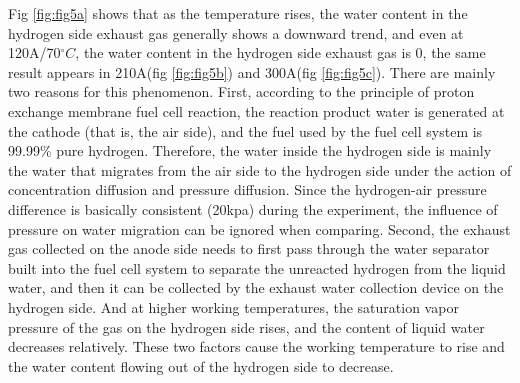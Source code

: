 \par
Fig \ref{fig:fig5a} shows that as the temperature rises, the water content in the hydrogen side exhaust gas generally shows a downward trend, and even at 120A/70$^{\circ}C$, the water content in the hydrogen side exhaust gas is 0, the same result appears in 210A(fig \ref{fig:fig5b}) and 300A(fig \ref{fig:fig5c}). There are mainly two reasons for this phenomenon.  First, according to the principle of proton exchange membrane fuel cell reaction, the reaction product water is generated at the cathode (that is, the air side), and the fuel used by the fuel cell system is 99.99\% pure hydrogen. Therefore, the water inside the hydrogen side is mainly the water that migrates from the air side to the hydrogen side under the action of concentration diffusion and pressure diffusion. Since the hydrogen-air pressure difference is basically consistent (20kpa) during the experiment, the influence of pressure on water migration can be ignored when comparing. Second, the exhaust gas collected on the anode side needs to first pass through the water separator built into the fuel cell system to separate the unreacted hydrogen from the liquid water, and then it can be collected by the exhaust water collection device on the hydrogen side. And at higher working temperatures, the saturation vapor pressure of the gas on the hydrogen side rises, and the content of liquid water decreases relatively. These two factors cause the working temperature to rise and the water content flowing out of the hydrogen side to decrease.

